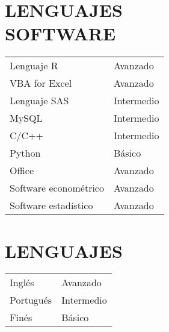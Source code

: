 \documentclass[margin]{res}
\begin{document}
\begin{resume}
\section{LENGUAJES \\ SOFTWARE} 
\begin{tabular}{ l l }
  Lenguaje R & \hspace{1cm} Avanzado\\
  VBA for Excel & \hspace{1cm} Avanzado\\
  Lenguaje SAS & \hspace{1cm} Intermedio\\
  MySQL & \hspace{1cm} Intermedio\\
  C/C++ & \hspace{1cm} Intermedio\\
  Python & \hspace{1cm} Básico\\[0.2cm]
  Office & \hspace{1cm} Avanzado\\
  Software econométrico & \hspace{1cm} Avanzado\\
  Software estadístico & \hspace{1cm} Avanzado\\
\end{tabular}


\section{LENGUAJES}
\begin{tabular}{ l l }
  Inglés & \hspace{2.9cm} Avanzado\\
  Portugués & \hspace{2.9cm} Intermedio\\
  Finés & \hspace{2.9cm} Básico\\
\end{tabular}



\end{resume}
\end{document}
